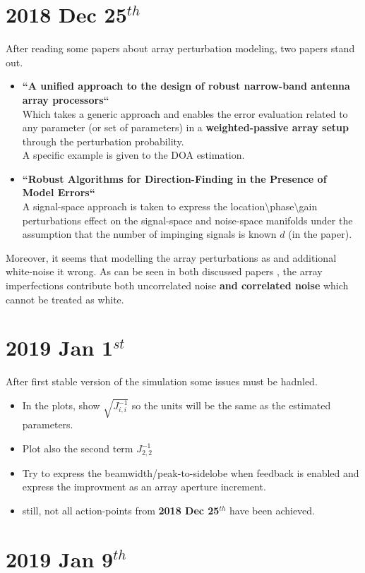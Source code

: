 \documentclass[12pt]{article}
\begin{document}
\section{2018 Dec 25$^{th}$}
After reading some papers about array perturbation modeling, two papers stand out.
\begin{itemize}
    \item \textbf{``A unified approach to the design of robust narrow-band antenna array processors``} \cite{Er2009AProcessors}\\
    Which takes a generic approach and enables the error evaluation related to any parameter (or set of parameters) in a \textbf{weighted-passive array setup} through the perturbation probability.\\
    A specific example is given to the DOA estimation.
    \item \textbf{``Robust Algorithms for Direction-Finding in the Presence of Model Errors``}\cite{SwindlehurstRobustErrors}\\
    A signal-space approach is taken to express the location\textbackslash phase\textbackslash gain perturbations effect on the signal-space and noise-space manifolds under the assumption that the number of impinging signals is known $d$ (in the paper).
\end{itemize}
Moreover, it seems that modelling the array perturbations as and additional white-noise it wrong. As can be seen in both discussed papers \cite{Er2009AProcessors,SwindlehurstRobustErrors}, the array imperfections contribute both uncorrelated noise \textbf{and correlated noise} which cannot be treated as white.
\section{2019 Jan 1$^{st}$}
After first stable version of the simulation some issues must be hadnled.
\begin{itemize}
    \item In the plots, show $\sqrt{J^{-1}_{i,i}}$ so the units will be the same as the estimated parameters.
    \item Plot also the second term $J^{-1}_{2,2}$
    \item Try to express the beamwidth/peak-to-sidelobe when feedback is enabled and express the improvment as an array aperture increment.
    \item still, not all action-points from \textbf{2018 Dec 25$^{th}$} have been achieved. 
\end{itemize}
\section{2019 Jan 9$^{th}$}
\end{document}
